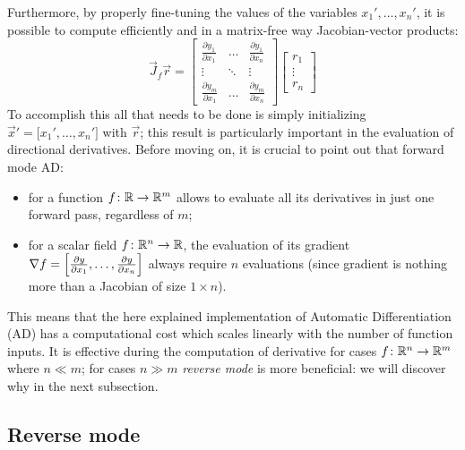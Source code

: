 Furthermore, by properly fine-tuning the values of the variables $x_1', \dots, x_n'$, it is possible to compute efficiently and in a matrix-free way Jacobian-vector products:
\[
\vec{J}_f \vec{r} =
\begin{bmatrix}
	\frac{\partial y_1}{\partial x_1} &  \dots  & \frac{\partial y_1}{\partial x_n}  \\
	\vdots							  & \ddots  & \vdots							 \\
	\frac{\partial y_m}{\partial x_1} &  \dots  & \frac{\partial y_m}{\partial x_n}
\end{bmatrix}
\begin{bmatrix}
	r_1		\\
	\vdots  \\
	r_n
\end{bmatrix}
\]
To accomplish this all that needs to be done is simply initializing $\vec{x}'=\big[x_1', \dots, x_n' \big]$ with $\vec{r}$; this result is particularly important in the evaluation of directional derivatives.
Before moving on, it is crucial to point out that forward mode AD:
\begin{itemize}
	\item for a function $f \colon \mathbb{R} \to \mathbb{R}^m$ allows to evaluate all its derivatives in just one forward pass, regardless of $m$;
	\item for a scalar field $f \colon \mathbb{R}^n \to \mathbb{R}$, the evaluation of its gradient $\nabla f = \Bigl[ \frac{\partial y}{\partial x_1}, \dots, \frac{\partial y}{\partial x_n} \Bigr]$ always require $n$ evaluations (since gradient is nothing more than a Jacobian of size $1 \times n$).
\end{itemize}
This means that the here explained implementation of Automatic Differentiation (AD) has a computational cost which scales linearly with the number of function inputs. It is effective during the computation of derivative for cases $f \colon \mathbb{R}^n \to \mathbb{R}^m$ where $n \ll m$; for cases $n \gg m$ \emph{reverse mode} is more beneficial: we will discover why in the next subsection.


\subsection{Reverse mode}
\label{subsec:reverse_mode_AD}

